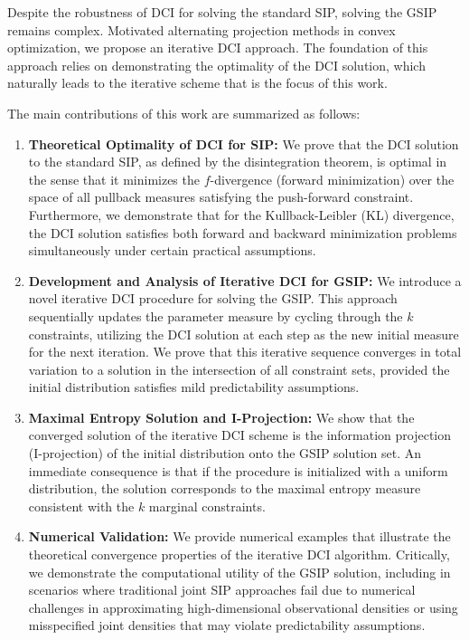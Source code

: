 \documentclass{article}
\newcounter{example}[section]
\begin{document}
Despite the robustness of DCI for solving the standard SIP, solving the GSIP remains complex. 
Motivated alternating projection methods in convex optimization, we propose an iterative DCI approach. 
The foundation of this approach relies on demonstrating the optimality of the DCI solution, which naturally leads to the iterative scheme that is the focus of this work.

The main contributions of this work are summarized as follows:
\begin{enumerate}
    \item \textbf{Theoretical Optimality of DCI for SIP:} We prove that the DCI solution to the standard SIP, as defined by the disintegration theorem, is optimal in the sense that it minimizes the $f$-divergence (forward minimization) over the space of all pullback measures satisfying the push-forward constraint. Furthermore, we demonstrate that for the Kullback-Leibler (KL) divergence, the DCI solution satisfies both forward and backward minimization problems simultaneously under certain practical assumptions.
    \item \textbf{Development and Analysis of Iterative DCI for GSIP:} We introduce a novel iterative DCI procedure for solving the GSIP. This approach sequentially updates the parameter measure by cycling through the $k$ constraints, utilizing the DCI solution at each step as the new initial measure for the next iteration. We prove that this iterative sequence converges in total variation to a solution in the intersection of all constraint sets, provided the initial distribution satisfies mild predictability assumptions.
    \item \textbf{Maximal Entropy Solution and I-Projection:} We show that the converged solution of the iterative DCI scheme is the information projection (I-projection) of the initial distribution onto the GSIP solution set. 
    An immediate consequence is that if the procedure is initialized with a uniform distribution, the solution corresponds to the maximal entropy measure consistent with the $k$ marginal constraints.
    \item \textbf{Numerical Validation:} We provide numerical examples that illustrate the theoretical convergence properties of the iterative DCI algorithm. Critically, we demonstrate the computational utility of the GSIP solution, including in scenarios where traditional joint SIP approaches fail due to numerical challenges in approximating high-dimensional observational densities or using misspecified joint densities that may violate predictability assumptions.
\end{enumerate}
\end{document}
